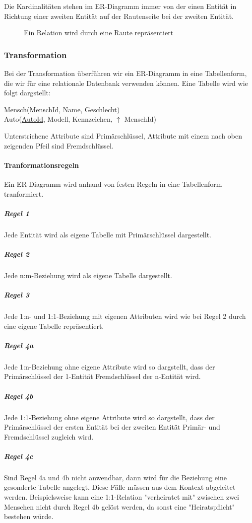 \documentclass{article}
\begin{document}
	Die Kardinalitäten stehen im ER-Diagramm immer von der einen Entität in Richtung einer zweiten Entität auf der Rautenseite bei der zweiten Entität.

	\begin{figure}[h!]
		\centering
		
		\caption{Ein Relation wird durch eine Raute repräsentiert}
	\end{figure}

	\subsubsection{Transformation}
	Bei der Transformation überführen wir ein ER-Diagramm in eine Tabellenform, die wir für eine relationale Datenbank verwenden können.
	Eine Tabelle wird wie folgt dargstellt:
	\begin{center}
		Mensch(\underline{MenschId}, Name, Geschlecht) \\
		Auto(\underline{AutoId}, Modell, Kennzeichen, $\uparrow$ MenschId)
	\end{center}
	Unterstrichene Attribute sind Primärschlüssel, Attribute mit einem nach oben zeigenden Pfeil sind Fremdschlüssel.

	\paragraph{Tranformationsregeln}
	Ein ER-Diagramm wird anhand von festen Regeln in eine Tabellenform tranformiert.

	\subparagraph{Regel 1}
	Jede Entität wird als eigene Tabelle mit Primärschlüssel dargestellt.

	\subparagraph{Regel 2}
	Jede n:m-Beziehung wird als eigene Tabelle dargestellt.

	\subparagraph{Regel 3}
	Jede 1:n- und 1:1-Beziehung mit eigenen Attributen wird wie bei Regel 2 durch eine eigene Tabelle repräsentiert.

	\subparagraph{Regel 4a}
	Jede 1:n-Beziehung ohne eigene Attribute wird so dargstellt, dass der Primärschlüssel der 1-Entität Fremdschlüssel der n-Entität wird.

	\subparagraph{Regel 4b}
	Jede 1:1-Beziehung ohne eigene Attribute wird so dargstellt, dass der Primärschlüssel der ersten Entität bei der zweiten Entität Primär- und Fremdschlüssel zugleich wird.

	\subparagraph{Regel 4c}
	Sind Regel 4a und 4b nicht anwendbar, dann wird für die Beziehung eine gesonderte Tabelle angelegt. Diese Fälle müssen aus dem Kontext abgeleitet werden.
	Beispielsweise kann eine 1:1-Relation "verheiratet mit" zwischen zwei Menschen nicht durch Regel 4b gelöst werden, da sonst eine "Heiratspflicht" bestehen würde.
\end{document}
